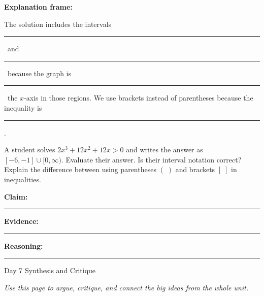 \documentclass[10pt]{article}
\newcommand{\writespace}[1]{\vspace{#1}}
\newcommand{\blankline}{\rule{1.5in}{0.4pt}}
\newcommand{\dayheading}[3]{%
  \begin{tcolorbox}[enhanced, colback=dayblue, colframe=dayblue,
    arc=0pt, left=8pt, right=8pt, top=5pt, bottom=5pt,
    fontupper=\Large\bfseries\sffamily\color{white}]
    Day #1 \;\textbar\; #2
  \end{tcolorbox}
  \vspace{1pt}
  {\small\itshape #3}%
}
\begin{document}
\vspace{6pt}

\begin{generalizebox}
\textbf{Explanation frame:}

The solution includes the intervals \blankline\ and \blankline\ because the graph is \blankline\ the $x$-axis in those regions. We use brackets instead of parentheses because the inequality is \blankline.
\end{generalizebox}

\vspace{6pt}

\begin{cerbox}
A student solves $2x^3 + 12x^2 + 12x > 0$ and writes the answer as $[-6, -1] \cup [0, \infty)$. Evaluate their answer. Is their interval notation correct? Explain the difference between using parentheses $(\;)$ and brackets $[\;]$ in inequalities.

\vspace{6pt}
\textbf{Claim:} \blankline

\vspace{4pt}
\textbf{Evidence:} \blankline

\vspace{4pt}
\textbf{Reasoning:} \blankline

\writespace{14pt}
\end{cerbox}

\newpage

\dayheading{7}{Synthesis and Critique}{Use this page to argue, critique, and connect the big ideas from the whole unit.}

\vspace{4pt}
\end{document}
